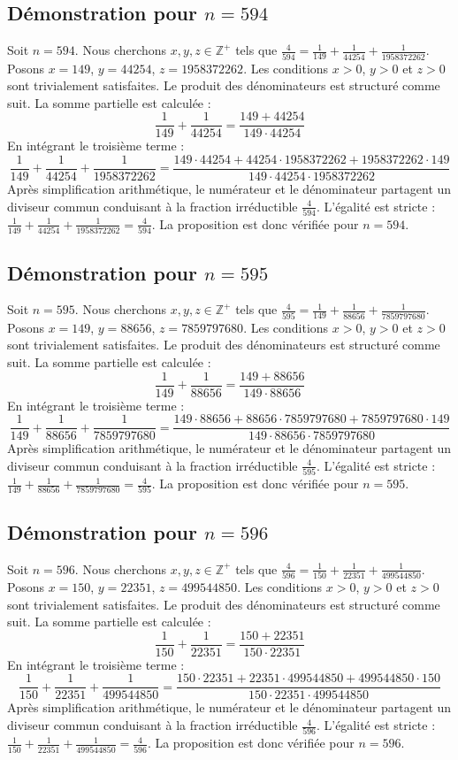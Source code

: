 \documentclass[11pt,a4paper]{article}
\begin{document}
\subsection{Démonstration pour $n = 594$}
Soit $n = 594$. Nous cherchons $x, y, z \in \mathbb{Z}^{+}$ tels que $\frac{4}{594} = \frac{1}{149} + \frac{1}{44254} + \frac{1}{1958372262}$.
Posons $x = 149$, $y = 44254$, $z = 1958372262$.
Les conditions $x > 0$, $y > 0$ et $z > 0$ sont trivialement satisfaites.
Le produit des dénominateurs est structuré comme suit. La somme partielle est calculée :
$$ \frac{1}{149} + \frac{1}{44254} = \frac{149+44254}{149 \cdot 44254} $$
En intégrant le troisième terme :
$$ \frac{1}{149} + \frac{1}{44254} + \frac{1}{1958372262} = \frac{149 \cdot 44254 + 44254 \cdot 1958372262 + 1958372262 \cdot 149}{149 \cdot 44254 \cdot 1958372262} $$
Après simplification arithmétique, le numérateur et le dénominateur partagent un diviseur commun conduisant à la fraction irréductible $\frac{4}{594}$.
L'égalité est stricte : $\frac{1}{149} + \frac{1}{44254} + \frac{1}{1958372262} = \frac{4}{594}$.
La proposition est donc vérifiée pour $n = 594$.
\subsection{Démonstration pour $n = 595$}
Soit $n = 595$. Nous cherchons $x, y, z \in \mathbb{Z}^{+}$ tels que $\frac{4}{595} = \frac{1}{149} + \frac{1}{88656} + \frac{1}{7859797680}$.
Posons $x = 149$, $y = 88656$, $z = 7859797680$.
Les conditions $x > 0$, $y > 0$ et $z > 0$ sont trivialement satisfaites.
Le produit des dénominateurs est structuré comme suit. La somme partielle est calculée :
$$ \frac{1}{149} + \frac{1}{88656} = \frac{149+88656}{149 \cdot 88656} $$
En intégrant le troisième terme :
$$ \frac{1}{149} + \frac{1}{88656} + \frac{1}{7859797680} = \frac{149 \cdot 88656 + 88656 \cdot 7859797680 + 7859797680 \cdot 149}{149 \cdot 88656 \cdot 7859797680} $$
Après simplification arithmétique, le numérateur et le dénominateur partagent un diviseur commun conduisant à la fraction irréductible $\frac{4}{595}$.
L'égalité est stricte : $\frac{1}{149} + \frac{1}{88656} + \frac{1}{7859797680} = \frac{4}{595}$.
La proposition est donc vérifiée pour $n = 595$.
\subsection{Démonstration pour $n = 596$}
Soit $n = 596$. Nous cherchons $x, y, z \in \mathbb{Z}^{+}$ tels que $\frac{4}{596} = \frac{1}{150} + \frac{1}{22351} + \frac{1}{499544850}$.
Posons $x = 150$, $y = 22351$, $z = 499544850$.
Les conditions $x > 0$, $y > 0$ et $z > 0$ sont trivialement satisfaites.
Le produit des dénominateurs est structuré comme suit. La somme partielle est calculée :
$$ \frac{1}{150} + \frac{1}{22351} = \frac{150+22351}{150 \cdot 22351} $$
En intégrant le troisième terme :
$$ \frac{1}{150} + \frac{1}{22351} + \frac{1}{499544850} = \frac{150 \cdot 22351 + 22351 \cdot 499544850 + 499544850 \cdot 150}{150 \cdot 22351 \cdot 499544850} $$
Après simplification arithmétique, le numérateur et le dénominateur partagent un diviseur commun conduisant à la fraction irréductible $\frac{4}{596}$.
L'égalité est stricte : $\frac{1}{150} + \frac{1}{22351} + \frac{1}{499544850} = \frac{4}{596}$.
La proposition est donc vérifiée pour $n = 596$.
\end{document}
